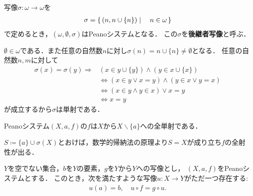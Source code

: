 	\begin{screen}
		\begin{thm}
			写像$\sigma:\omega \longrightarrow \omega$を
			\begin{align}
				\sigma = \left\{\, (n, n \cup \{n\}) \mid \quad n \in \omega\, \right\}
			\end{align}
			で定めるとき，$(\omega,\emptyset,\sigma)$はPeanoシステムとなる．
			この$\sigma$を{\bf 後継者写像}と呼ぶ．
		\end{thm}
	\end{screen}
	
	\begin{prf}
		$\emptyset \in \omega$である．また任意の自然数$n$に対し$\sigma(n) = n \cup \{n\} \neq \emptyset$となる．
		任意の自然数$n,m$に対して
		\begin{align}
			\sigma(x)=\sigma(y) \Longrightarrow &(x \in y \cup \{y\}) \wedge (y \in x \cup \{x\}) \\
					&\Longleftrightarrow \left( x \in y \vee x=y \right) \wedge 
						\left( y \in x \vee y=x \right) \\
					&\Longleftrightarrow  \left( x \in y \wedge y \in x \right) \vee x = y \\
					&\Longleftrightarrow x = y
		\end{align}
		が成立するから$\sigma$は単射である．
	\end{prf}
	
	\begin{screen}
		\begin{thm}[Peanoシステムの写像は全単射]\label{thm:successor_mapping_is_injective}
			Peanoシステム$(X,a,f)$の$f$は$X$から$X \backslash \{a\}$への全単射である．
		\end{thm}
	\end{screen}
	
	\begin{prf}
		$S \coloneqq \{a\} \cup \sigma(X)$とおけば，数学的帰納法の原理より$S = X$が成り立ち$f$の全射性が出る．
		\QED
	\end{prf}
	
	\begin{screen}
		\begin{thm}[再帰定理]\label{thm:Peano_recursion_theorem}
			$Y$を空でない集合，$b$を$Y$の要素，$g$を$Y$から$Y$への写像とし，
			$(X,a,f)$をPeanoシステムとする．
			このとき，次を満たすような写像$u:X \longrightarrow Y$がただ一つ存在する:
			\begin{align}
				u(a) = b,\quad u \circ f = g \circ u.
				\label{eq:thm_Peano_recursion_theorem}
			\end{align}
		\end{thm}
	\end{screen}
	
